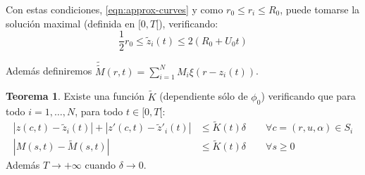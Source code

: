 \documentclass[a4paper,10pt]{scrartcl}
\theoremstyle{definition}
\newtheorem{theorem}{Teorema}
\newcommand{\ktilde}{\widetilde{K}}
\newcommand{\dtilde}[1]{\widetilde{\widetilde{#1}}}
\numberwithin{equation}{section}
\begin{document}
Con estas condiciones, \eqref{eqn:approx-curves} y como $r_0 \le r_i \le R_0$, puede tomarse la solución maximal (definida en $[0,T[$), verificando:
\begin{equation}
    \frac{1}{2}r_0 \le \widetilde{z}_i(t) \le 2(R_0 + U_0t)
\label{eqn:barzbounds}
\end{equation}

Además definiremos $\dtilde{M}(r,t) = \sum_{i=1}^N M_i \xi(r-z_i(t))$.
\begin{theorem}
 Existe una función $\widetilde{K}$ (dependiente sólo de $\phi_0$) verificando que para todo $i = 1, \ldots, N$, para todo $t\in [0,T[$:
 \begin{align*}
  |z(c,t) - \widetilde{z}_i(t)| + |z'(c,t) - \widetilde{z}'_i(t)| &\le \ktilde(t) \delta \qquad \forall c= (r,u,\alpha) \in S_i \\
  |M(s,t) - \widetilde{M}(s,t)| &\le \ktilde(t)\delta \qquad \forall s \ge 0
 \end{align*}
 Además $T \rightarrow + \infty$ cuando $\delta \rightarrow 0$.
 \label{th:fundamental}
\end{theorem}
\end{document}
